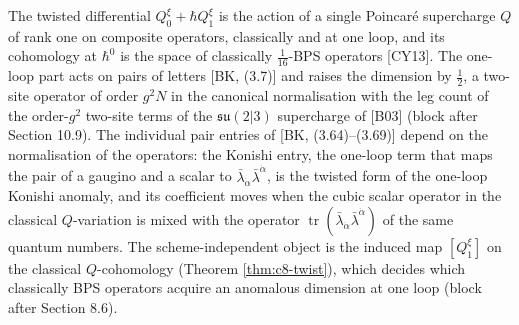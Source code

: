 \begin{remark}
The twisted differential $Q^\xi_0+\hbar Q^\xi_1$ is the action of a single Poincar\'e supercharge $Q$ of rank one on composite operators, classically and at one loop, and its cohomology at $\hbar^0$ is the space of classically $\tfrac1{16}$-BPS operators [CY13]. The one-loop part acts on pairs of letters [BK, (3.7)] and raises the dimension by $\tfrac12$, a two-site operator of order $g^2N$ in the canonical normalisation with the leg count of the order-$g^2$ two-site terms of the $\mathfrak{su}(2|3)$ supercharge of [B03] (block after Section 10.9). The individual pair entries of [BK, (3.64)--(3.69)] depend on the normalisation of the operators: the Konishi entry, the one-loop term that maps the pair of a gaugino and a scalar to $\bar\lambda_{\dot\alpha}\bar\lambda^{\dot\alpha}$, is the twisted form of the one-loop Konishi anomaly, and its coefficient moves when the cubic scalar operator in the classical $Q$-variation is mixed with the operator $\operatorname{tr}(\bar\lambda_{\dot\alpha}\bar\lambda^{\dot\alpha})$ of the same quantum numbers. The scheme-independent object is the induced map $[Q^\xi_1]$ on the classical $Q$-cohomology (Theorem \ref{thm:c8-twist}), which decides which classically BPS operators acquire an anomalous dimension at one loop (block after Section 8.6).
\end{remark}
